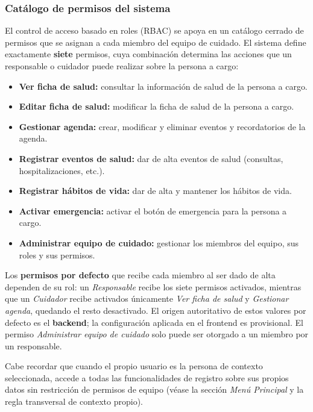 \documentclass[a4paper,12pt]{article}
\begin{document}
    \subsubsection{Catálogo de permisos del sistema}
    \par El control de acceso basado en roles (RBAC) se apoya en un catálogo cerrado de permisos que se asignan a cada miembro del equipo de cuidado. El sistema define exactamente \textbf{siete} permisos, cuya combinación determina las acciones que un responsable o cuidador puede realizar sobre la persona a cargo:
    \begin{itemize}
        \item \textbf{Ver ficha de salud:} consultar la información de salud de la persona a cargo.
        \item \textbf{Editar ficha de salud:} modificar la ficha de salud de la persona a cargo.
        \item \textbf{Gestionar agenda:} crear, modificar y eliminar eventos y recordatorios de la agenda.
        \item \textbf{Registrar eventos de salud:} dar de alta eventos de salud (consultas, hospitalizaciones, etc.).
        \item \textbf{Registrar hábitos de vida:} dar de alta y mantener los hábitos de vida.
        \item \textbf{Activar emergencia:} activar el botón de emergencia para la persona a cargo.
        \item \textbf{Administrar equipo de cuidado:} gestionar los miembros del equipo, sus roles y sus permisos.
    \end{itemize}
    \par Los \textbf{permisos por defecto} que recibe cada miembro al ser dado de alta dependen de su rol: un \textit{Responsable} recibe los siete permisos activados, mientras que un \textit{Cuidador} recibe activados únicamente \textit{Ver ficha de salud} y \textit{Gestionar agenda}, quedando el resto desactivado. El origen autoritativo de estos valores por defecto es el \textbf{backend}; la configuración aplicada en el frontend es provisional. El permiso \textit{Administrar equipo de cuidado} solo puede ser otorgado a un miembro por un responsable.
    \par Cabe recordar que cuando el propio usuario es la persona de contexto seleccionada, accede a todas las funcionalidades de registro sobre sus propios datos sin restricción de permisos de equipo (véase la sección \textit{Menú Principal} y la regla transversal de contexto propio).
\end{document}
